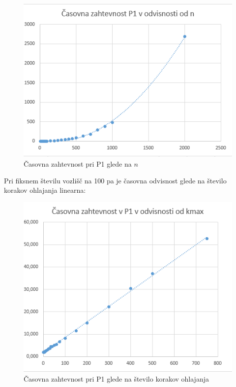 \documentclass[a4paper, 12 pt]{article}
\begin{document}
\begin{figure}[H]
\centering
  \includegraphics[width=12cm]{casovna_p1_n.png}
  \caption{Časovna zahtevnost pri P1 glede na $n$}
  \label{fig:p1_časovna_zaht_n} 
\end{figure}


\vspace{1cm}

Pri fiksnem številu vozlišč na 100 pa je časovna odvisnost glede na število korakov ohlajanja linearna:

\begin{figure}[H]
\centering
  \includegraphics[width=12cm]{casovna_p1_kmax.png}
  \caption{Časovna zahtevnost pri P1 glede na število korakov ohlajanja}
  \label{fig:p1_časovna_zaht_kmax} 
\end{figure}

\vspace{1cm}
\end{document}
